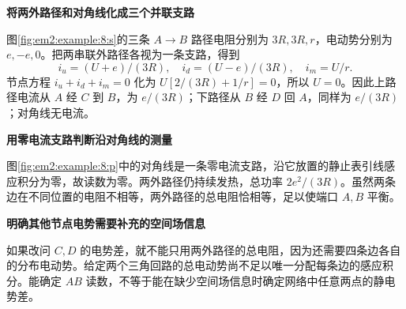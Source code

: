 \begin{solution}\textbf{将两外路径和对角线化成三个并联支路}\par\nobreak
图\ref{fig:em2:example:8:s}的三条 $A\to B$ 路径电阻分别为 $3R,3R,r$，电动势分别为 $e,-e,0$。把两串联外路径各视为一条支路，得到
\[i_u=(U+e)/(3R),\quad i_d=(U-e)/(3R),\quad i_m=U/r.\]
节点方程 $i_u+i_d+i_m=0$ 化为 $U[2/(3R)+1/r]=0$，所以 $U=0$。因此上路径电流从 $A$ 经 $C$ 到 $B$，为 $e/(3R)$；下路径从 $B$ 经 $D$ 回 $A$，同样为 $e/(3R)$；对角线无电流。



\par\medskip{}\noindent\textbf{用零电流支路判断沿对角线的测量}\par\nobreak
图\ref{fig:em2:example:8:p}中的对角线是一条零电流支路，沿它放置的静止表引线感应积分为零，故读数为零。两外路径仍持续发热，总功率 $2e^2/(3R)$。虽然两条边在不同位置的电阻不相等，两外路径的总电阻恰相等，足以使端口 $A,B$ 平衡。



\par\medskip{}\noindent\textbf{明确其他节点电势需要补充的空间场信息}\par\nobreak
如果改问 $C,D$ 的电势差，就不能只用两外路径的总电阻，因为还需要四条边各自的分布电动势。给定两个三角回路的总电动势尚不足以唯一分配每条边的感应积分。能确定 $AB$ 读数，不等于能在缺少空间场信息时确定网络中任意两点的静电势差。\end{solution}
